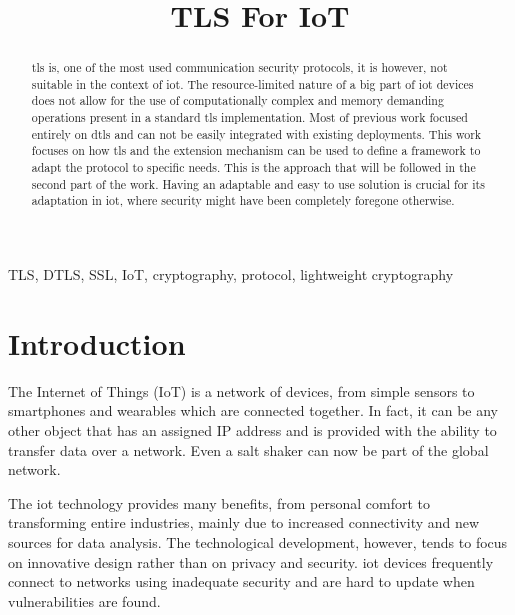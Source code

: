 \documentclass[conference]{IEEEtran}
\begin{document}
\title{TLS For IoT}

\author{
}

\maketitle

\begin{abstract}
\gls{tls} is, one of the most used communication security protocols, it is however, not suitable in the context of \gls{iot}. The resource-limited nature
of a big part of \gls{iot} devices does not allow for the use of computationally complex
and memory demanding operations present in a standard \gls{tls} implementation. Most of previous work focused entirely on \gls{dtls} and
can not be easily integrated with existing deployments. This work focuses on
how \gls{tls} and the extension mechanism can be used to define a framework
to adapt the protocol to specific needs. This is the approach that
will be followed in the second part of the work. Having an adaptable and
easy to use solution is crucial for its adaptation in \gls{iot},
where security might have been completely foregone otherwise.
\end{abstract}

\begin{IEEEkeywords}
TLS, DTLS, SSL, IoT, cryptography, protocol, lightweight cryptography
\end{IEEEkeywords}

\section{Introduction}
The Internet of Things (IoT) is a network of devices, from simple sensors to smartphones and wearables
which are connected together. In fact, it can be any other object that has an assigned
IP address and is provided with the ability to transfer data over a network. Even a salt shaker\cite{SMALTThe76:online} can now be part of the global network.

The \gls{iot} technology provides many benefits, from personal comfort to
transforming entire industries, mainly due to increased connectivity and
new sources for data analysis. The technological development, however, tends to focus on
innovative design rather than on privacy and security. \gls{iot} devices frequently
connect to networks using inadequate security and are hard to update when
vulnerabilities are found.
\end{document}
